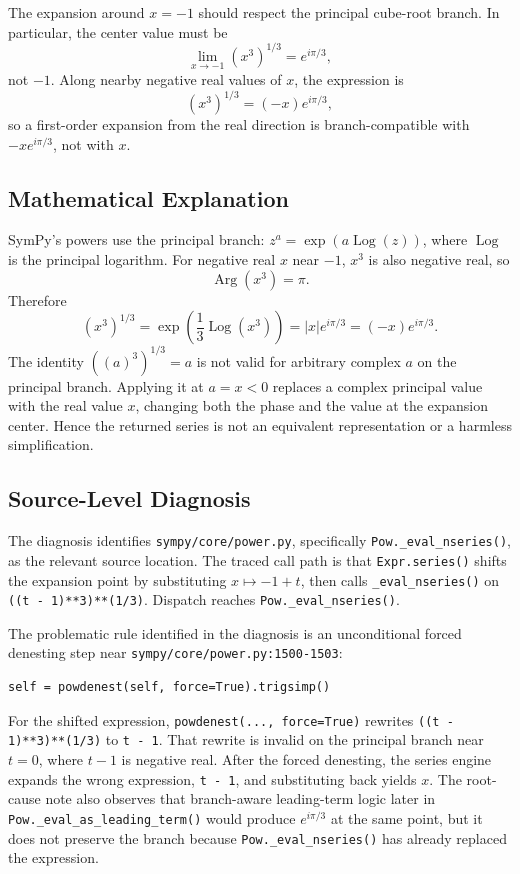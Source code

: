 \documentclass[11pt]{article}
\begin{document}
The expansion around \(x=-1\) should respect the principal cube-root branch.  In particular, the center value must be
\[
    \lim_{x \to -1} (x^3)^{1/3} = e^{i\pi/3},
\]
not \(-1\).  Along nearby negative real values of \(x\), the expression is
\[
    (x^3)^{1/3} = (-x)e^{i\pi/3},
\]
so a first-order expansion from the real direction is branch-compatible with \(-x e^{i\pi/3}\), not with \(x\).

\subsection{Mathematical Explanation}

SymPy's powers use the principal branch: \(z^a = \exp(a\operatorname{Log}(z))\), where \(\operatorname{Log}\) is the principal logarithm.  For negative real \(x\) near \(-1\), \(x^3\) is also negative real, so
\[
    \operatorname{Arg}(x^3) = \pi.
\]
Therefore
\[
    (x^3)^{1/3}
    = \exp\!\left(\frac{1}{3}\operatorname{Log}(x^3)\right)
    = |x|e^{i\pi/3}
    = (-x)e^{i\pi/3}.
\]
The identity \(((a)^3)^{1/3}=a\) is not valid for arbitrary complex \(a\) on the principal branch.  Applying it at \(a=x<0\) replaces a complex principal value with the real value \(x\), changing both the phase and the value at the expansion center.  Hence the returned series is not an equivalent representation or a harmless simplification.

\subsection{Source-Level Diagnosis}

The diagnosis identifies \nolinkurl{sympy/core/power.py}, specifically \texttt{Pow.\_eval\_nseries()}, as the relevant source location.  The traced call path is that \texttt{Expr.series()} shifts the expansion point by substituting \(x \mapsto -1+t\), then calls \texttt{\_eval\_nseries()} on \texttt{((t - 1)**3)**(1/3)}.  Dispatch reaches \texttt{Pow.\_eval\_nseries()}.

The problematic rule identified in the diagnosis is an unconditional forced denesting step near \nolinkurl{sympy/core/power.py:1500-1503}:

\begin{lstlisting}[style=bugpython]
self = powdenest(self, force=True).trigsimp()
\end{lstlisting}

For the shifted expression, \texttt{powdenest(..., force=True)} rewrites \texttt{((t - 1)**3)**(1/3)} to \texttt{t - 1}.  That rewrite is invalid on the principal branch near \(t=0\), where \(t-1\) is negative real.  After the forced denesting, the series engine expands the wrong expression, \texttt{t - 1}, and substituting back yields \(x\).  The root-cause note also observes that branch-aware leading-term logic later in \texttt{Pow.\_eval\_as\_leading\_term()} would produce \(e^{i\pi/3}\) at the same point, but it does not preserve the branch because \texttt{Pow.\_eval\_nseries()} has already replaced the expression.
\end{document}
